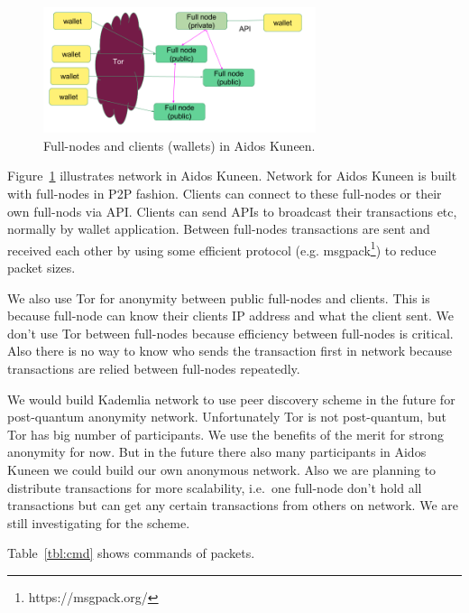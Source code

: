 \documentclass[a4paper,10pt,twocolumn]{article}
\begin{document}
\begin{figure}[ht]
	\begin{center}
	\includegraphics[width=80mm]{network.png}
	  \caption{Full-nodes and clients (wallets) in Aidos Kuneen.}
    \label{fig:network}
	\end{center}
 \end{figure}

 Figure~\ref{fig:network} illustrates network in Aidos Kuneen.
Network for Aidos Kuneen is built with full-nodes in P2P fashion. Clients can connect to these full-nodes
or their own full-nods via API. Clients can send APIs to broadcast their transactions etc, normally by wallet application.
 Between full-nodes transactions are sent and received each other by using some efficient protocol (e.g. msgpack\footnote{https://msgpack.org/})
 to reduce packet sizes. 

We also use Tor for anonymity between public full-nodes and clients. This is because 
full-node can know their clients IP address and what the client sent.  We don't use Tor between full-nodes because efficiency between
full-nodes is critical. Also  there is no way to know who sends the transaction first in network because transactions are relied between 
full-nodes repeatedly.

We would build Kademlia network to use peer discovery scheme in the future for post-quantum anonymity network. 
Unfortunately Tor is not post-quantum, but Tor has big number of participants. We use the benefits of the merit
for strong anonymity for now. But in the future there also many participants in Aidos Kuneen we could build our own anonymous network.
Also we are planning to distribute transactions for more scalability, i.e.\ one full-node don't hold all transactions but can get any certain
transactions from others on network.
We are still investigating for the scheme.

Table~\ref{tbl:cmd} shows commands of packets.

\end{document}
